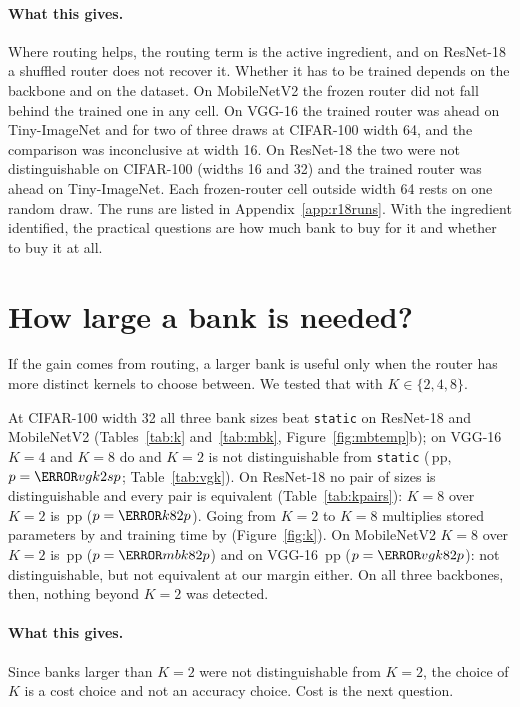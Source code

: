 \documentclass[10pt,a4paper]{article}
\begin{document}
\paragraph{What this gives.} Where routing helps, the routing term is the active
ingredient, and on ResNet-18 a shuffled router does not recover it. Whether it has to be
trained depends on the backbone and on the dataset. On MobileNetV2 the frozen
router did not fall behind the trained one in any cell. On VGG-16 the
trained router was ahead on Tiny-ImageNet and for two of three draws at
CIFAR-100 width 64, and the comparison was inconclusive at width 16. On ResNet-18 the two were
not distinguishable on CIFAR-100 (widths 16 and 32) and the trained router was ahead on Tiny-ImageNet. Each frozen-router
cell outside width 64 rests on one random draw. The runs are listed in
Appendix~\ref{app:r18runs}. With the ingredient identified, the practical
questions are how much bank to buy for it and whether to buy it at all.

\section{How large a bank is needed?}\label{sec:ksize}

If the gain comes from routing, a larger bank is useful only when the router
has more distinct kernels to choose between. We tested that with $K\in\{2,4,8\}$.

At CIFAR-100 width 32 all three bank sizes beat \texttt{static} on
ResNet-18 and MobileNetV2 (Tables~\ref{tab:k} and~\ref{tab:mbk},
Figure~\ref{fig:mbtemp}b); on VGG-16 $K=4$ and $K=8$ do and $K=2$ is not
distinguishable from \texttt{static} (\,pp, $p=\V{vgk2sp}$;
Table~\ref{tab:vgk}). On ResNet-18 no pair of sizes is distinguishable and
every pair is equivalent (Table~\ref{tab:kpairs}): $K=8$ over $K=2$ is
\,pp ($p=\V{k82p}$). Going from $K=2$ to $K=8$ multiplies stored
parameters by  and training time by  (Figure~\ref{fig:k}).
On MobileNetV2 $K=8$ over $K=2$ is \,pp ($p=\V{mbk82p}$) and on
VGG-16 \,pp ($p=\V{vgk82p}$): not distinguishable, but not
equivalent at our margin either. On all three backbones, then, nothing
beyond $K=2$ was detected.

\paragraph{What this gives.} Since banks larger than $K=2$ were not distinguishable from $K=2$, the
choice of $K$ is a cost choice and not an accuracy choice. Cost is the next
question.
\end{document}
